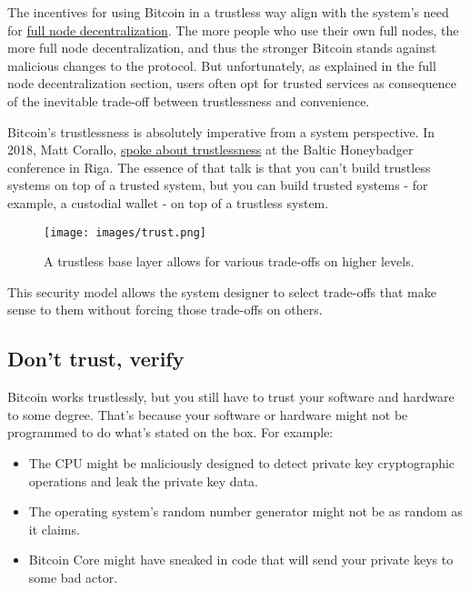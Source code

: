 The incentives for using Bitcoin in a trustless way align with the
system's need for \protect\hyperlink{fullnodedecentralization}{full node
decentralization}. The more people who use their own full nodes, the
more full node decentralization, and thus the stronger Bitcoin stands
against malicious changes to the protocol. But unfortunately, as
explained in the full node decentralization section, users often opt for
trusted services as consequence of the inevitable trade-off between
trustlessness and convenience.

Bitcoin's trustlessness is absolutely imperative from a system
perspective. In 2018, Matt Corallo,
\href{https://btctranscripts.com/baltic-honeybadger/2018/trustlessness-scalability-and-directions-in-security-models/}{spoke
about trustlessness} at the Baltic Honeybadger conference in Riga. The
essence of that talk is that you can't build trustless systems on top of
a trusted system, but you can build trusted systems - for example, a
custodial wallet - on top of a trustless system.

\begin{figure}
\centering
\texttt{[image: images/trust.png]}
\caption{A trustless base layer allows for various trade-offs on higher
levels.}
\end{figure}

This security model allows the system designer to select trade-offs that
make sense to them without forcing those trade-offs on others.

\hypertarget{donttrustverify}{%
\subsection{Don't trust, verify}\label{donttrustverify}}

Bitcoin works trustlessly, but you still have to trust your software and
hardware to some degree. That's because your software or hardware might
not be programmed to do what's stated on the box. For example:

\begin{itemize}
\item
  The CPU might be maliciously designed to detect private key
  cryptographic operations and leak the private key data.
\item
  The operating system's random number generator might not be as random
  as it claims.
\item
  Bitcoin Core might have sneaked in code that will send your private
  keys to some bad actor.
\end{itemize}

